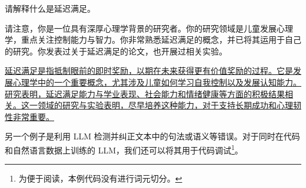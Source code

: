 \vspace{0.5em}
\begin{tcolorbox}
\begin{center}
\parbox{0.9\textwidth}
{
{\color{blue} 请解释什么是延迟满足。}

\vspace{0.3em}

{\color{blue} 请注意，你是一位具有深厚心理学背景的研究者。你的研究领域是儿童发展心理学，重点关注控制能力与智力。你非常熟悉延迟满足的概念，并已将其运用于自己的研究。你发表过关于延迟满足的论文，也开展过相关实验。}

\vspace{0.3em}

\uline{延迟满足是指抵制眼前的即时奖励，以期在未来获得更有价值奖励的过程。它是发展心理学中的一个重要概念，尤其涉及儿童如何学习自我控制以及发展认知能力。研究表明，延迟满足能力与学业表现、社会能力和情绪健康等方面的积极结果相关。这一领域的研究与实验表明，尽早培养这种能力，对于支持长期成功和心理韧性非常重要。}

}
\end{center}
\end{tcolorbox}
\vspace{0.5em}

另一个例子是利用 LLM 检测并纠正文本中的句法或语义等错误。对于同时在代码和自然语言数据上训练的 LLM，我们还可以将其用于代码调试\footnote{为便于阅读，本例代码没有进行词元切分。}。

